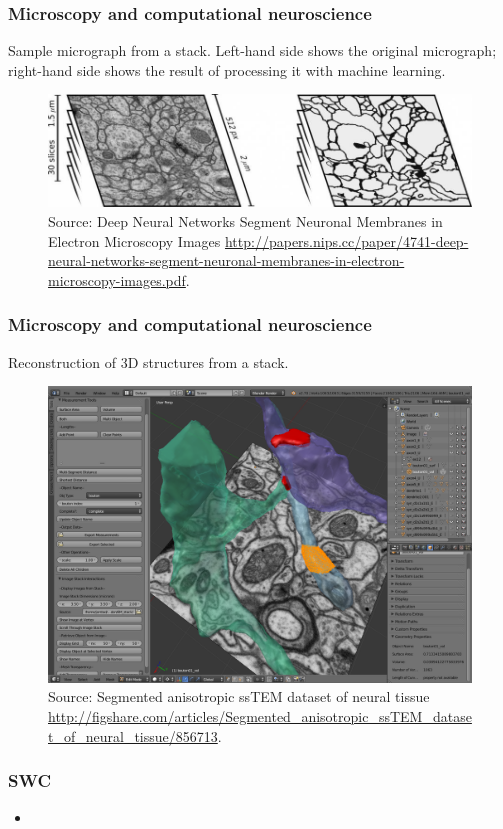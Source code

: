 \documentclass{beamer}
\begin{document}
\begin{frame}
\frametitle{Microscopy and computational neuroscience}

Sample micrograph from a stack. Left-hand side shows the original
micrograph; right-hand side shows the result of processing it with
machine learning.

\begin{figure}[H]
    \centering
    \includegraphics[scale=0.3]{../blog/images/biomed-neurons}
    \caption{Source: Deep Neural Networks Segment Neuronal Membranes in Electron Microscopy Images
      \url{http://papers.nips.cc/paper/4741-deep-neural-networks-segment-neuronal-membranes-in-electron-microscopy-images.pdf}.}
    \label{fig:stack}
\end{figure}

\end{frame}

\begin{frame}
\frametitle{Microscopy and computational neuroscience}

Reconstruction of 3D structures from a stack.

\begin{figure}[H]
    \centering
    \includegraphics[scale=0.2]{../blog/images/NeuroMorph_screenshot.png}
    \caption{Source: Segmented anisotropic ssTEM dataset of neural tissue
      \url{http://figshare.com/articles/Segmented_anisotropic_ssTEM_dataset_of_neural_tissue/856713}.}
    \label{fig:3d_stack}
\end{figure}

\end{frame}

\begin{frame}
\frametitle{SWC}

\begin{itemize}

\item

\end{itemize}

\end{frame}

\begin{frame}
  \printbibliography
\end{frame}
\end{document}
